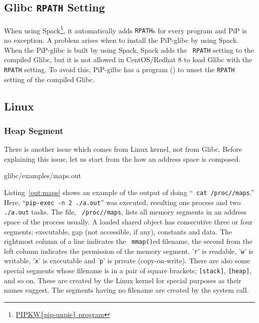 \subsection{Glibc {\tt RPATH} Setting}

When using Spack\footnote{\url{PIPKW{pip-unpie} program}}, it
automatically adds {\tt RPATH}s for every program and PiP is no
exception. A problem arises when to install the PiP-glibc by using
Spack. When the PiP-glibc is built by using Spack, Spack adds the {\tt
  RPATH} setting to the compiled Glibc, but it is not allowed in
CentOS/Redhat 8 to load Glibc with the {\tt RPATH} setting. To avoid
this, PiP-gilbc has a program () to unset
the {\tt RPATH} setting of the compiled Glibc.

\subsection{Linux}

\subsubsection{Heap Segment}\label{sec:heap}

There is another issue which comes from Linux kernel, not from
Glibc. Before explaining this issue, let us start from the how an
address space is composed. 

 {glibc/examples/maps.out}

Listing~\ref{out:maps} shows an example of the output of doing ``{\tt
  cat /proc//maps}.'' Here, ``{\tt pip-exec -n 2
  ./a.out}'' was executed, resulting one  process
and two {\tt ./a.out} tasks. The file, {\tt
  /proc//maps}, lists all memory
segments in an address space of the process {\tt {}}
usually. A loaded shared object has consecutive three or four segments; 
executable, gap (not accessible, if any), constants and data. 
The rightmost column of a line indicates the {\tt
  mmap()}ed filename, the second from the left column indicates the
permission of the memory segment. '{\tt r}' is readable, '{\tt w}' is
writable, '{\tt x}' is executable and '{\tt p}' is private
(copy-on-write). There are also some special segments whose filename
is in a pair of square brackets; {\tt [stack]}, {\tt [heap]}, and so
on. These are created by the Linux kernel for special purposes as
their names suggest. The segments having no filename are created by
the  system call. 

